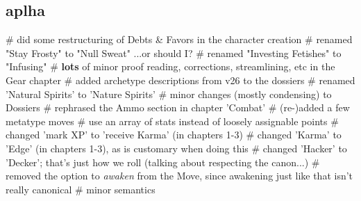 \subsection*{aplha}
\begin{easylist}
# did some restructuring of Debts \& Favors in the character creation
# renamed "Stay Frosty" to "Null Sweat" ...or should I?
# renamed "Investing Fetishes" to "Infusing"
# \textbf{lots} of minor proof reading, corrections, streamlining, etc in the Gear chapter
# added archetype descriptions from v26 to the dossiers
# renamed 'Natural Spirits' to 'Nature Spirits'
# minor changes (mostly condensing) to Dossiers
# rephrased the Ammo section in chapter 'Combat'
# (re-)added a few metatype moves
# use an array of stats instead of loosely assignable points
# changed 'mark XP' to 'receive Karma' (in chapters 1-3)
# changed 'Karma' to 'Edge' (in chapters 1-3), as is customary when doing this
# changed 'Hacker' to 'Decker'; that's just how we roll (talking about respecting the canon...)
# removed the option to \textit{awaken} from the  Move, since awakening just like that isn't really canonical
# minor semantics
\end{easylist}

